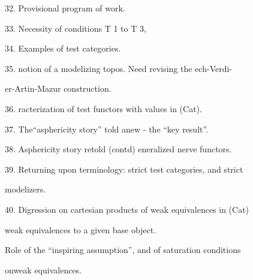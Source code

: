 \margin{$\downarrow$}32.  Provisional program of work.\par
\margin{$\bigcirc$}33.  Necessity of conditions T 1 to T 3, \par
{}\par
34.  Examples of test categories. \margin{\rule{2cm}{0.4pt}}\par

35.   notion of a modelizing topos.   Need revising the ech-Verdi-\par%
er-Artin-Mazur construction.\par
36.  racterization of test functors with values in (Cat). \margin{\rule{2cm}{0.4pt}}\par

\margin{$\bigcirc$}37.  The``asphericity story'' told anew  -  the ``key result''.  \margin{\rule{2cm}{0.4pt}}\par
38.  Asphericity story retold (contd)\hand{:} eneralized nerve functors.\par
39.  Returning upon terminology:  strict test categories, and strict\par
modelizers.\par
40.  Digression on cartesian products of weak equivalences in (Cat)\hand{;}\par
\hand{\unsure{\&}}  weak equivalences to a given base object.\par
{}  Role of the ``inspiring assumption'',  and of saturation conditions\par
onweak equivalences. \margin{\rule{2cm}{0.4pt}}\par

